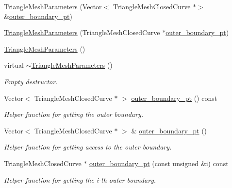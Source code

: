 \begin{DoxyCompactItemize}
\item 
\hyperlink{classoomph_1_1TriangleMeshParameters_ac8e4f397da81bbeaf03aaea8ce85272c}{Triangle\+Mesh\+Parameters} (Vector$<$ Triangle\+Mesh\+Closed\+Curve $\ast$$>$ \&\hyperlink{classoomph_1_1TriangleMeshParameters_adf9ce760b49599e041fffb041fb4eb0e}{outer\+\_\+boundary\+\_\+pt})
\item 
\hyperlink{classoomph_1_1TriangleMeshParameters_a674b9be72cdd5c72877f07b434882704}{Triangle\+Mesh\+Parameters} (Triangle\+Mesh\+Closed\+Curve $\ast$\hyperlink{classoomph_1_1TriangleMeshParameters_adf9ce760b49599e041fffb041fb4eb0e}{outer\+\_\+boundary\+\_\+pt})
\item 
\hyperlink{classoomph_1_1TriangleMeshParameters_a942be2020ecd26582855d1920ce23803}{Triangle\+Mesh\+Parameters} ()
\item 
virtual \hyperlink{classoomph_1_1TriangleMeshParameters_a2f475a9f1c9d9d89122cfaf706dfff90}{$\sim$\+Triangle\+Mesh\+Parameters} ()
\begin{DoxyCompactList}\small\item\em Empty destructor. \end{DoxyCompactList}\item 
Vector$<$ Triangle\+Mesh\+Closed\+Curve $\ast$ $>$ \hyperlink{classoomph_1_1TriangleMeshParameters_adf9ce760b49599e041fffb041fb4eb0e}{outer\+\_\+boundary\+\_\+pt} () const
\begin{DoxyCompactList}\small\item\em Helper function for getting the outer boundary. \end{DoxyCompactList}\item 
Vector$<$ Triangle\+Mesh\+Closed\+Curve $\ast$ $>$ \& \hyperlink{classoomph_1_1TriangleMeshParameters_aa1b1acddc11df631c8fd692866a59e12}{outer\+\_\+boundary\+\_\+pt} ()
\begin{DoxyCompactList}\small\item\em Helper function for getting access to the outer boundary. \end{DoxyCompactList}\item 
Triangle\+Mesh\+Closed\+Curve $\ast$ \hyperlink{classoomph_1_1TriangleMeshParameters_a1b2f09177982f5c2f5a96d3f532d6ee7}{outer\+\_\+boundary\+\_\+pt} (const unsigned \&i) const
\begin{DoxyCompactList}\small\item\em Helper function for getting the i-\/th outer boundary. \end{DoxyCompactList}\item 
$$
\end{DoxyCompactItemize}
